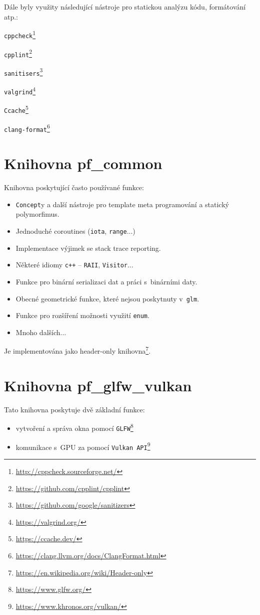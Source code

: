 Dále byly využity následující nástroje pro statickou analýzu kódu, formátování atp.:
\begin{itemize}
\end{itemize}

\section{Knihovna pf\_common}
Knihovna poskytující často používané funkce:
\begin{itemize}
	\item \texttt{Concept}y a další nástroje pro template meta programování a statický polymorfimus.
	\item Jednoduché coroutines (\texttt{iota}, \texttt{range}...)
	\item Implementace výjimek se stack trace reporting.
	\item Některé idiomy \texttt{c++} -- \texttt{RAII}, \texttt{Visitor}...
	\item Funkce pro binární serializaci dat a práci s~binárními daty.
	\item Obecné geometrické funkce, které nejsou poskytnuty v~\texttt{glm}.
	\item Funkce pro rozšíření možnosti využití \texttt{enum}.
	\item Mnoho dalších...
\end{itemize}

Je implementována jako header-only knihovna\footnote{\url{https://en.wikipedia.org/wiki/Header-only}}.

\section{Knihovna pf\_glfw\_vulkan}
Tato knihovna poskytuje dvě základní funkce:
\begin{itemize}
	\item vytvoření a správa okna pomocí \texttt{GLFW}\footnote{\url{https://www.glfw.org/}}
	\item komunikace s~GPU za pomocí \texttt{Vulkan API}\footnote{\url{https://www.khronos.org/vulkan/}}
\end{itemize}

